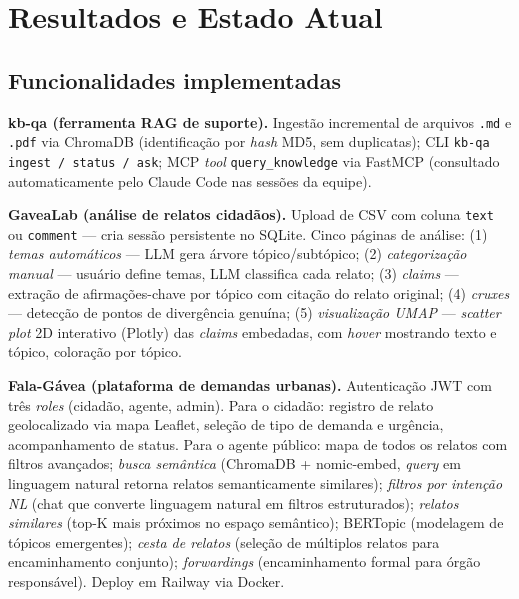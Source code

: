 \documentclass[12pt,a4paper]{article}
\begin{document}


\section{Resultados e Estado Atual}

\subsection{Funcionalidades implementadas}

\textbf{kb-qa (ferramenta RAG de suporte).}
Ingestão incremental de arquivos \texttt{.md} e \texttt{.pdf} via ChromaDB (identificação
por \textit{hash} MD5, sem duplicatas); CLI \texttt{kb-qa ingest / status / ask}; MCP
\textit{tool} \texttt{query\_knowledge} via FastMCP (consultado automaticamente pelo
Claude Code nas sessões da equipe).

\textbf{GaveaLab (análise de relatos cidadãos).}
Upload de CSV com coluna \texttt{text} ou \texttt{comment} — cria sessão persistente no
SQLite. Cinco páginas de análise: (1) \textit{temas automáticos} — LLM gera árvore
tópico/subtópico; (2) \textit{categorização manual} — usuário define temas, LLM classifica
cada relato; (3) \textit{claims} — extração de afirmações-chave por tópico com citação
do relato original; (4) \textit{cruxes} — detecção de pontos de divergência genuína;
(5) \textit{visualização UMAP} — \textit{scatter plot} 2D interativo (Plotly) das
\textit{claims} embedadas, com \textit{hover} mostrando texto e tópico, coloração por
tópico.

\textbf{Fala-Gávea (plataforma de demandas urbanas).}
Autenticação JWT com três \textit{roles} (cidadão, agente, admin). Para o cidadão:
registro de relato geolocalizado via mapa Leaflet, seleção de tipo de demanda e urgência,
acompanhamento de status. Para o agente público: mapa de todos os relatos com filtros
avançados; \textit{busca semântica} (ChromaDB + nomic-embed, \textit{query} em linguagem
natural retorna relatos semanticamente similares); \textit{filtros por intenção NL}
(chat que converte linguagem natural em filtros estruturados); \textit{relatos similares}
(top-K mais próximos no espaço semântico); BERTopic (modelagem de tópicos emergentes);
\textit{cesta de relatos} (seleção de múltiplos relatos para encaminhamento conjunto);
\textit{forwardings} (encaminhamento formal para órgão responsável). Deploy em Railway via
Docker.
\end{document}
